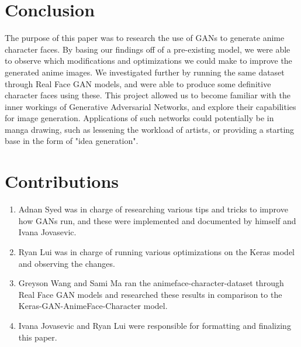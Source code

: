 \documentclass{article} %
\begin{document}
\section{Conclusion}
The purpose of this paper was to research the use of GANs to generate anime character faces. By basing our findings off of a pre-existing model, we were able to observe which modifications and optimizations we could make to improve the generated anime images. We investigated further by running the same dataset through Real Face GAN models, and were able to produce some definitive character faces using these. This project allowed us to become familiar with the inner workings of Generative Adversarial Networks, and explore their capabilities for image generation.  Applications of such networks could potentially be in manga drawing, such as lessening the workload of artists, or providing a starting base in the form of "idea generation".

\section{Contributions}
\begin{enumerate}
	\item Adnan Syed was in charge of researching various tips and tricks to improve how GANs run, and these were implemented and documented by himself and Ivana Jovasevic.
	\item Ryan Lui was in charge of running various optimizations on the Keras model and observing the changes.
	\item Greyson Wang and Sami Ma ran the animeface-character-dataset through Real Face GAN models and researched these results in comparison to the Keras-GAN-AnimeFace-Character model.
	\item Ivana Jovasevic and Ryan Lui were responsible for formatting and finalizing this paper.
\end{enumerate}



\end{document}
